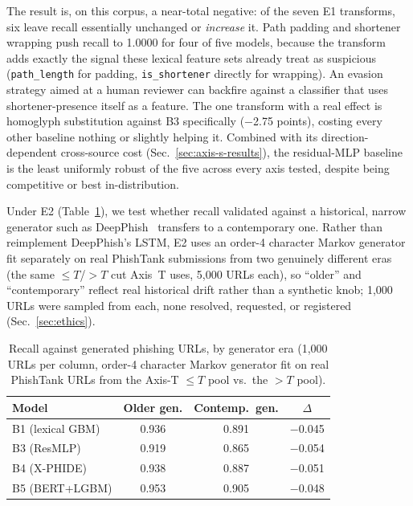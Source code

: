 \documentclass[conference]{IEEEtran}
\begin{document}
The result is, on this corpus, a near-total negative: of the seven E1
transforms, six leave recall essentially unchanged or \emph{increase} it.
Path padding and shortener wrapping push recall to 1.0000 for four of
five models, because the transform adds exactly the signal these lexical
feature sets already treat as suspicious (\texttt{path\_length} for
padding, \texttt{is\_shortener} directly for wrapping). An evasion strategy aimed
at a human reviewer can backfire against a classifier that
uses shortener-presence itself as a feature. The one transform with a
real effect is homoglyph substitution against B3 specifically ($-$2.75
points), costing every other baseline nothing or slightly helping it.
Combined with its direction-dependent cross-source cost
(Sec.~\ref{sec:axis-s-results}), the residual-MLP baseline is the least
uniformly robust of the five across every axis tested, despite being
competitive or best in-distribution.

Under E2 (Table~\ref{tab:axise2}), we test whether recall validated
against a historical, narrow generator such as
DeepPhish~\cite{bahnsen2018deepphish} transfers to a contemporary one.
Rather than reimplement DeepPhish's LSTM, E2 uses an order-4 character
Markov generator fit separately on real PhishTank submissions from two
genuinely different eras (the same $\le T$/$>T$ cut Axis~T uses, 5{,}000
URLs each), so ``older'' and ``contemporary'' reflect real historical
drift rather than a synthetic knob; 1{,}000 URLs were sampled from each,
none resolved, requested, or registered (Sec.~\ref{sec:ethics}).

\begin{table}[t]
\caption{Recall against generated phishing URLs, by generator era (1{,}000
URLs per column, order-4 character Markov generator fit on real PhishTank
URLs from the Axis-T $\le T$ pool vs.\ the $>T$ pool).}
\label{tab:axise2}
\centering\footnotesize
\setlength{\tabcolsep}{4pt}
\begin{tabular}{@{}lccc@{}}
\toprule
\textbf{Model} & \textbf{Older gen.} & \textbf{Contemp.\ gen.} & \textbf{$\Delta$}\\
\midrule
B1 (lexical GBM)  & 0.936 & 0.891 & $-$0.045\\
B3 (ResMLP)       & 0.919 & 0.865 & $-$0.054\\
B4 (X-PHIDE)      & 0.938 & 0.887 & $-$0.051\\
B5 (BERT+LGBM)    & 0.953 & 0.905 & $-$0.048\\
\bottomrule
\end{tabular}
\end{table}
\end{document}
